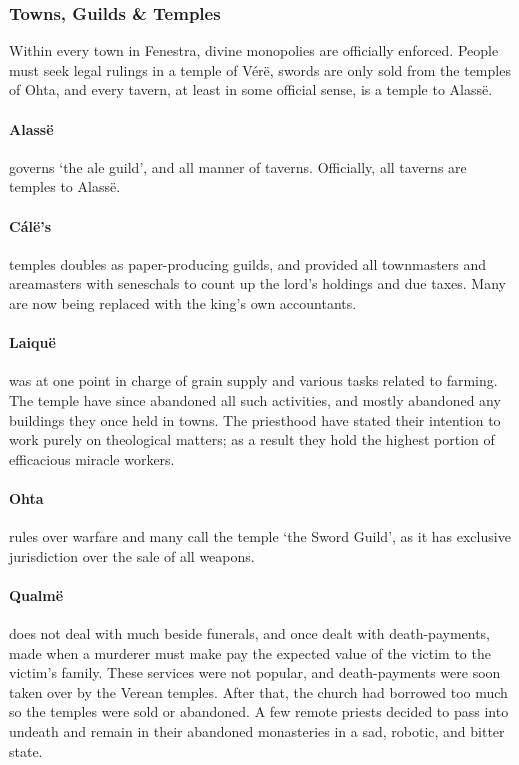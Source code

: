 \begin{multicols}{2}
\subsubsection{Towns, Guilds \& Temples}

Within every town in Fenestra, divine monopolies are officially enforced.
People must seek legal rulings in a temple of V\'{e}r\"{e}, swords are only sold from the temples of Ohta, and every tavern, at least in some official sense, is a temple to Alass\"{e}.

\paragraph{Alass\"{e}} governs `the ale guild', and all manner of taverns.  Officially, all taverns are temples to Alass\"{e}.

\paragraph{C\'{a}l\"{e}'s} temples doubles as paper-producing guilds, and provided all townmasters and areamasters with seneschals to count up the lord's holdings and due taxes.
Many are now being replaced with the \gls{king}'s own accountants.

\paragraph{Laiqu\"{e}} was at one point in charge of grain supply and various tasks related to farming.
The temple have since abandoned all such activities, and mostly abandoned any buildings they once held in towns.
The priesthood have stated their intention to work purely on theological matters; as a result they hold the highest portion of efficacious miracle workers.

\paragraph{Ohta} rules over warfare and many call the temple `the Sword Guild', as it has exclusive jurisdiction over the sale of all weapons.

\paragraph{Qualm\"{e}} does not deal with much beside funerals, and once dealt with death-payments, made when a murderer must make pay the expected value of the victim to the victim's family.
These services were not popular, and death-payments were soon taken over by the Verean temples.
After that, the church had borrowed too much so the temples were sold or abandoned.
A few remote priests decided to pass into undeath and remain in their abandoned monasteries in a sad, robotic, and bitter state.


\end{multicols}
